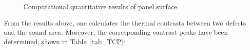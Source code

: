 \documentclass{tQRT2e}
\begin{document}
\begin{figure}
    \hspace{-18pt}
    \hspace{6pt}
	\caption{Computational quantitative results of panel surface}
	\label{sim_fig}
\end{figure}
From the results above, one calculates the thermal contrasts between two defects and the sound area. Moreover, the corresponding contrast peaks have been determined, shown in Table~\ref{tab_TCP}:
\end{document}
